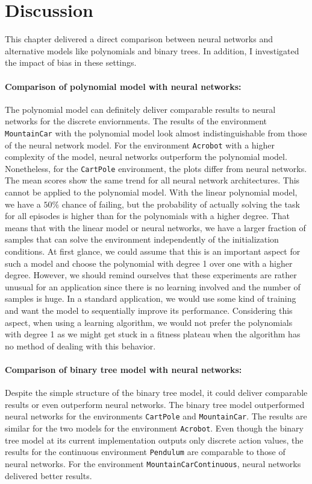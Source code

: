 
\clearpage
\section{Discussion}
This chapter delivered a direct comparison between neural networks and alternative models like polynomials and binary trees. In addition, I investigated the impact of bias in these settings.

\paragraph*{Comparison of polynomial model with neural networks:} The polynomial model can definitely deliver comparable results to neural networks for the discrete enviornments. The results of the environment \texttt{MountainCar} with the polynomial model look almost indistinguishable from those of the neural network model. For the environment \texttt{Acrobot} with a higher complexity of the model, neural networks outperform the polynomial model. Nonetheless, for the \texttt{CartPole} environment, the plots differ from neural networks. The mean scores show the same trend for all neural network architectures. This cannot be applied to the polynomial model. With the linear polynomial model, we have a $50 \%$ chance of failing, but the probability of actually solving the task for all episodes is higher than for the polynomials with a higher degree. That means that with the linear model or neural networks, we have a larger fraction of samples that can solve the environment independently of the initialization conditions. At first glance, we could assume that this is an important aspect for such a model and choose the polynomial with degree 1 over one with a higher degree. However, we should remind ourselves that these experiments are rather unusual for an application since there is no learning involved and the number of samples is huge. In a standard application, we would use some kind of training and want the model to sequentially improve its performance. Considering this aspect, when using a learning algorithm, we would not prefer the polynomials with degree 1 as we might get stuck in a fitness plateau when the algorithm has no method of dealing with this behavior.

\paragraph*{Comparison of binary tree model with neural networks:} Despite the simple structure of the binary tree model, it could deliver comparable results or even outperform neural networks. The binary tree model outperformed neural networks for the environments \verb|CartPole| and \verb|MountainCar|. The results are similar for the two models for the environment \verb|Acrobot|. Even though the binary tree model at its current implementation outputs only discrete action values, the results for the continuous environment \verb|Pendulum| are comparable to those of neural networks. For the environment \verb|MountainCarContinuous|, neural networks delivered better results.

